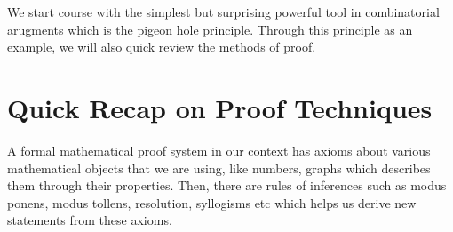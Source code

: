 
We start course with the simplest but surprising powerful tool in combinatorial arugments which is the pigeon hole principle. Through this principle as an example, we will also quick review the methods of proof. 

\section{Quick Recap on Proof Techniques} 

A formal mathematical proof system in our context has axioms about various mathematical objects that we are using, like numbers, graphs which describes them through their properties. Then, there are rules of inferences such as modus ponens, modus tollens, resolution, syllogisms etc which helps us derive new statements from these axioms. 

